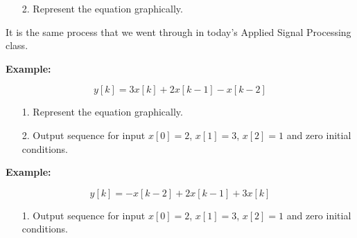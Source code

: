 \begin{itemize}
	\item[2.] Represent the equation graphically.
\end{itemize}

It is the same process that we went through in today's Applied Signal Processing class.

\textbf{Example:}

$$y[k] = 3x[k] + 2x[k-1] - x[k-2]$$

\begin{itemize}
	\item[1.] Represent the equation graphically.
\end{itemize}

\begin{itemize}
	\item[2.] Output sequence for input $x[0] = 2$, $x[1] = 3$, $x[2] = 1$ and zero initial conditions.
\end{itemize}

\textbf{Example:}

$$y[k] = -x[k-2] + 2x[k-1] + 3x[k]$$

\begin{itemize}
	\item[1.] Output sequence for input $x[0] = 2$, $x[1] = 3$, $x[2] = 1$ and zero initial conditions.
\end{itemize}




